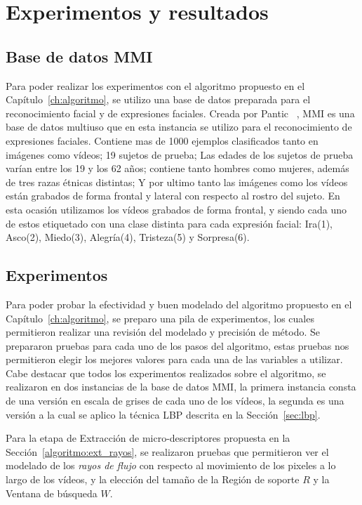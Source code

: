 \chapter[Experimentos y resultados]{Experimentos y resultados}
\label{ch:exp_result}

\section{Base de datos MMI}
\label{exp:bdd}
Para poder realizar los experimentos con el algoritmo propuesto en el Capítulo~\ref{ch:algoritmo}, se utilizo una base de datos preparada para el reconocimiento facial y de expresiones faciales. Creada por Pantic \etal~\cite{Pantic2005}, MMI es una base de datos multiuso que en esta instancia se utilizo para el reconocimiento de expresiones faciales. Contiene mas de 1000 ejemplos clasificados tanto en imágenes como vídeos; 19 sujetos de prueba; Las edades de los sujetos de prueba varían entre los 19 y los 62 años;  contiene tanto hombres como mujeres, además de tres razas étnicas distintas; Y por ultimo tanto las imágenes como los vídeos están grabados de forma frontal y lateral con respecto al rostro del sujeto. En esta ocasión utilizamos los vídeos grabados de forma frontal, y siendo cada uno de estos etiquetado con una clase distinta para cada expresión facial: Ira(1), Asco(2), Miedo(3), Alegría(4), Tristeza(5) y Sorpresa(6).

\section{Experimentos}
\label{exp:exp}

Para poder probar la efectividad y buen modelado del algoritmo propuesto en el Capítulo~\ref{ch:algoritmo}, se preparo una pila de experimentos, los cuales permitieron realizar una revisión del modelado y precisión de método.
Se prepararon pruebas para cada uno de los pasos del algoritmo, estas pruebas nos permitieron elegir los mejores valores para cada una de las variables a utilizar. Cabe destacar que todos los experimentos realizados sobre el algoritmo, se realizaron en dos instancias de la base de datos MMI, la primera instancia consta de una versión en escala de grises de cada uno de los vídeos, la segunda es una versión a la cual se aplico la técnica LBP descrita en la Sección~\ref{sec:lbp}.

Para la etapa de Extracción de micro-descriptores propuesta en la Sección~\ref{algoritmo:ext_rayos}, se realizaron pruebas que permitieron ver el modelado de los \textit{rayos de flujo} con respecto al movimiento de los pixeles a lo largo de los vídeos, y la elección del tamaño de la Región de soporte $R$ y la Ventana de búsqueda $W$.

